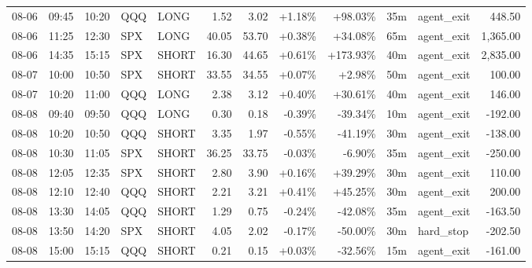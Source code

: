 \documentclass[11pt,a4paper,twoside]{article}
\begin{document}
\begin{center}
\begin{longtable}{>{\color{txtmain}}l l l l l r r r r r >{\color{txtmain}}l r}
08-06 & 09:45 & 10:20 & QQQ & LONG & 1.52 & 3.02 & \textcolor{wingreen}{+1.18\%} & \textcolor{wingreen}{+98.03\%} & 35m & agent\_exit & \textcolor{wingreen}{448.50} \\
08-06 & 11:25 & 12:30 & SPX & LONG & 40.05 & 53.70 & \textcolor{wingreen}{+0.38\%} & \textcolor{wingreen}{+34.08\%} & 65m & agent\_exit & \textcolor{wingreen}{1,365.00} \\
08-06 & 14:35 & 15:15 & SPX & SHORT & 16.30 & 44.65 & \textcolor{wingreen}{+0.61\%} & \textcolor{wingreen}{+173.93\%} & 40m & agent\_exit & \textcolor{wingreen}{2,835.00} \\
08-07 & 10:00 & 10:50 & SPX & SHORT & 33.55 & 34.55 & \textcolor{wingreen}{+0.07\%} & \textcolor{wingreen}{+2.98\%} & 50m & agent\_exit & \textcolor{wingreen}{100.00} \\
08-07 & 10:20 & 11:00 & QQQ & LONG & 2.38 & 3.12 & \textcolor{wingreen}{+0.40\%} & \textcolor{wingreen}{+30.61\%} & 40m & agent\_exit & \textcolor{wingreen}{146.00} \\
08-08 & 09:40 & 09:50 & QQQ & LONG & 0.30 & 0.18 & \textcolor{lossred}{-0.39\%} & \textcolor{lossred}{-39.34\%} & 10m & agent\_exit & \textcolor{lossred}{-192.00} \\
08-08 & 10:20 & 10:50 & QQQ & SHORT & 3.35 & 1.97 & \textcolor{lossred}{-0.55\%} & \textcolor{lossred}{-41.19\%} & 30m & agent\_exit & \textcolor{lossred}{-138.00} \\
08-08 & 10:30 & 11:05 & SPX & SHORT & 36.25 & 33.75 & \textcolor{lossred}{-0.03\%} & \textcolor{lossred}{-6.90\%} & 35m & agent\_exit & \textcolor{lossred}{-250.00} \\
08-08 & 12:05 & 12:35 & SPX & SHORT & 2.80 & 3.90 & \textcolor{wingreen}{+0.16\%} & \textcolor{wingreen}{+39.29\%} & 30m & agent\_exit & \textcolor{wingreen}{110.00} \\
08-08 & 12:10 & 12:40 & QQQ & SHORT & 2.21 & 3.21 & \textcolor{wingreen}{+0.41\%} & \textcolor{wingreen}{+45.25\%} & 30m & agent\_exit & \textcolor{wingreen}{200.00} \\
08-08 & 13:30 & 14:05 & QQQ & SHORT & 1.29 & 0.75 & \textcolor{lossred}{-0.24\%} & \textcolor{lossred}{-42.08\%} & 35m & agent\_exit & \textcolor{lossred}{-163.50} \\
08-08 & 13:50 & 14:20 & SPX & SHORT & 4.05 & 2.02 & \textcolor{lossred}{-0.17\%} & \textcolor{lossred}{-50.00\%} & 30m & hard\_stop & \textcolor{lossred}{-202.50} \\
08-08 & 15:00 & 15:15 & QQQ & SHORT & 0.21 & 0.15 & \textcolor{wingreen}{+0.03\%} & \textcolor{lossred}{-32.56\%} & 15m & agent\_exit & \textcolor{lossred}{-161.00} \\

\end{longtable}
\end{center}
\end{document}
